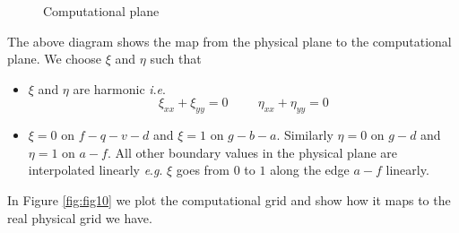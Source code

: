 \documentclass{article}
\numberwithin{equation}{section}
\theoremstyle{definition}
\newcommand{\ie}{\textit{i}.\textit{e}. }
\newcommand{\eg}{\textit{e}.\textit{g}. }
\begin{document}
    \begin{minipage}{0.5\textwidth}
        \begin{figure}[H]
            \centering
            \label{fig:comp}
            \caption*{Computational plane}
        \end{figure}
    \end{minipage}

The above diagram shows the map from the physical plane to the computational plane. We choose $\xi$ and $\eta$ such that
\begin{itemize}
    \item $\xi$ and $\eta$ are harmonic \ie 
    \begin{equation}
        \xi_{xx} + \xi_{yy} = 0 \hspace{1cm} \eta_{xx} + \eta_{yy} = 0
    \end{equation}
    \item $\xi = 0$ on $f - q - v - d$ and $\xi=1$ on $g - b - a$. Similarly $\eta=0$ on $g - d$ and $\eta=1$ on $a - f$. All other boundary values in the physical plane are interpolated linearly \eg $\xi$ goes from $0$ to $1$ along the edge $a - f$ linearly.
\end{itemize}

In Figure \ref{fig:fig10} we plot the computational grid and show how it maps to the real physical grid we have.
\end{document}
